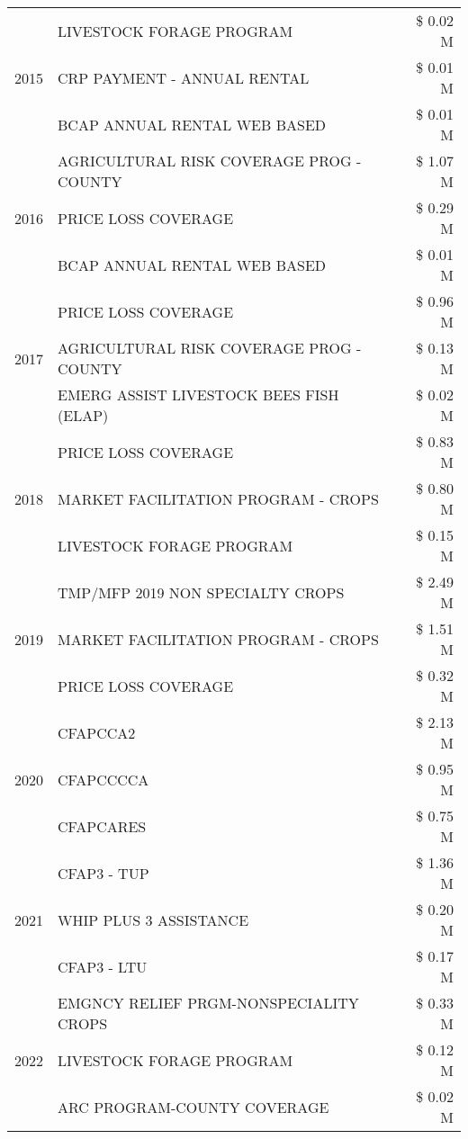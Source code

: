 \begin{tabular}{llr}
\cline{1-3}
\multirow[t]{3}{*}{2015} & LIVESTOCK FORAGE PROGRAM & \$ 0.02 M \\
 & CRP PAYMENT - ANNUAL RENTAL & \$ 0.01 M \\
 & BCAP ANNUAL RENTAL WEB BASED & \$ 0.01 M \\
\cline{1-3}
\multirow[t]{3}{*}{2016} & AGRICULTURAL RISK COVERAGE PROG - COUNTY & \$ 1.07 M \\
 & PRICE LOSS COVERAGE & \$ 0.29 M \\
 & BCAP ANNUAL RENTAL WEB BASED & \$ 0.01 M \\
\cline{1-3}
\multirow[t]{3}{*}{2017} & PRICE LOSS COVERAGE & \$ 0.96 M \\
 & AGRICULTURAL RISK COVERAGE PROG - COUNTY & \$ 0.13 M \\
 & EMERG ASSIST LIVESTOCK BEES FISH (ELAP) & \$ 0.02 M \\
\cline{1-3}
\multirow[t]{3}{*}{2018} & PRICE LOSS COVERAGE & \$ 0.83 M \\
 & MARKET FACILITATION PROGRAM - CROPS & \$ 0.80 M \\
 & LIVESTOCK FORAGE PROGRAM & \$ 0.15 M \\
\cline{1-3}
\multirow[t]{3}{*}{2019} & TMP/MFP 2019 NON SPECIALTY CROPS & \$ 2.49 M \\
 & MARKET FACILITATION PROGRAM - CROPS & \$ 1.51 M \\
 & PRICE LOSS COVERAGE & \$ 0.32 M \\
\cline{1-3}
\multirow[t]{3}{*}{2020} & CFAPCCA2 & \$ 2.13 M \\
 & CFAPCCCCA & \$ 0.95 M \\
 & CFAPCARES & \$ 0.75 M \\
\cline{1-3}
\multirow[t]{3}{*}{2021} & CFAP3 - TUP & \$ 1.36 M \\
 & WHIP PLUS 3 ASSISTANCE & \$ 0.20 M \\
 & CFAP3 - LTU & \$ 0.17 M \\
\cline{1-3}
\multirow[t]{3}{*}{2022} & EMGNCY RELIEF PRGM-NONSPECIALITY CROPS & \$ 0.33 M \\
 & LIVESTOCK FORAGE PROGRAM & \$ 0.12 M \\
 & ARC PROGRAM-COUNTY COVERAGE & \$ 0.02 M \\
\cline{1-3}
\bottomrule
\end{tabular}
